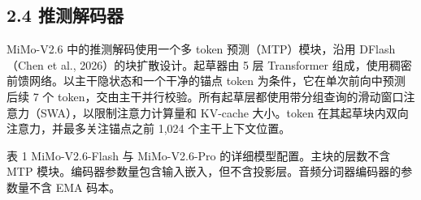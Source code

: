 \subsection{2.4 推测解码器}\label{speculative-decoder}

MiMo-V2.6 中的推测解码使用一个多 token 预测（MTP）模块，沿用 DFlash（Chen et al., 2026）的块扩散设计。起草器由 5 层 Transformer 组成，使用稠密前馈网络。以主干隐状态和一个干净的锚点 token 为条件，它在单次前向中预测后续 7 个 token，交由主干并行校验。所有起草层都使用带分组查询的滑动窗口注意力（SWA），以限制注意力计算量和 KV-cache 大小。token 在其起草块内双向注意力，并最多关注锚点之前 1,024 个主干上下文位置。



表 1 MiMo-V2.6-Flash 与 MiMo-V2.6-Pro 的详细模型配置。主块的层数不含 MTP 模块。编码器参数量包含输入嵌入，但不含投影层。音频分词器编码器的参数量不含 EMA 码本。

